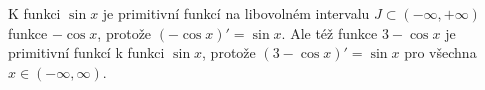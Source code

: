 \begin{mdframed}[style=mdexam]
  \begin{example}\label{mai:exam118}
    K funkci $\sin x$ je primitivní funkcí na libovolném intervalu $J\subset(-\infty,+\infty)$ 
    funkce $-\cos x$, protože $(-\cos x)' = \sin x$. Ale též funkce $3-\cos x$ je primitivní 
    funkcí k funkci $\sin x$, protože $(3 - \cos x)' = \sin x$ pro všechna $x\in(-\infty, 
    \infty)$.
  \end{example}
\end{mdframed}